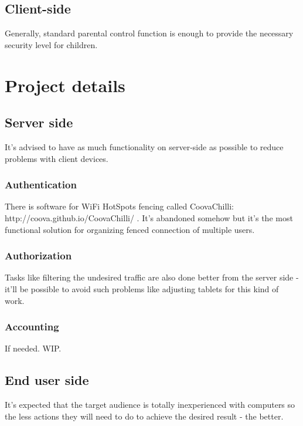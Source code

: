 \documentclass[a4paper, sans, booktabs, totpages, english]{report}
\begin{document}
\chapter{Client-side}

Generally, standard parental control function is enough to provide the
necessary security level for children.


\part{Project details}

\chapter{Server side}

It's advised to have as much functionality on server-side as possible
to reduce problems with client devices.


\section{Authentication}

There is software for WiFi HotSpots fencing called CoovaChilli:
http://coova.github.io/CoovaChilli/ . It's abandoned somehow but it's
the most functional solution for organizing fenced connection of
multiple users.


\section{Authorization}

Tasks like filtering the undesired traffic are also done better from
the server side - it'll be possible to avoid such problems like
adjusting tablets for this kind of work.


\section{Accounting}

If needed. WIP.


\chapter{End user side}

It's expected that the target audience is totally inexperienced with
computers so the less actions they will need to do to achieve the
desired result - the better.
\end{document}
